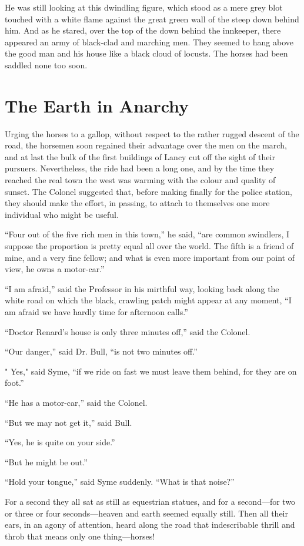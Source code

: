 \documentclass{book}
\begin{document}
He was still looking at this dwindling figure, which stood as a mere grey blot touched with a white flame against the great green wall of the steep down behind him. And as he stared, over the top of the down behind the innkeeper, there appeared an army of black-clad and marching men. They seemed to hang above the good man and his house like a black cloud of locusts. The horses had been saddled none too soon.

\chapter{The Earth in Anarchy}
\label{chapter-11}
Urging the horses to a gallop, without respect to the rather rugged descent of the road, the horsemen soon regained their advantage over the men on the march, and at last the bulk of the first buildings of Lancy cut off the sight of their pursuers. Nevertheless, the ride had been a long one, and by the time they reached the real town the west was warming with the colour and quality of sunset. The Colonel suggested that, before making finally for the police station, they should make the effort, in passing, to attach to themselves one more individual who might be useful.

“Four out of the five rich men in this town,” he said, “are common swindlers, I suppose the proportion is pretty equal all over the world. The fifth is a friend of mine, and a very fine fellow; and what is even more important from our point of view, he owns a motor-car.”

“I am afraid,” said the Professor in his mirthful way, looking back along the white road on which the black, crawling patch might appear at any moment, “I am afraid we have hardly time for afternoon calls.”

“Doctor Renard’s house is only three minutes off,” said the Colonel.

“Our danger,” said Dr. Bull, “is not two minutes off.”

" Yes," said Syme, “if we ride on fast we must leave them behind, for they are on foot.”

“He has a motor-car,” said the Colonel.

“But we may not get it,” said Bull.

“Yes, he is quite on your side.”

“But he might be out.”

“Hold your tongue,” said Syme suddenly. “What is that noise?”

For a second they all sat as still as equestrian statues, and for a second—for two or three or four seconds—heaven and earth seemed equally still. Then all their ears, in an agony of attention, heard along the road that indescribable thrill and throb that means only one thing—horses!
\end{document}
